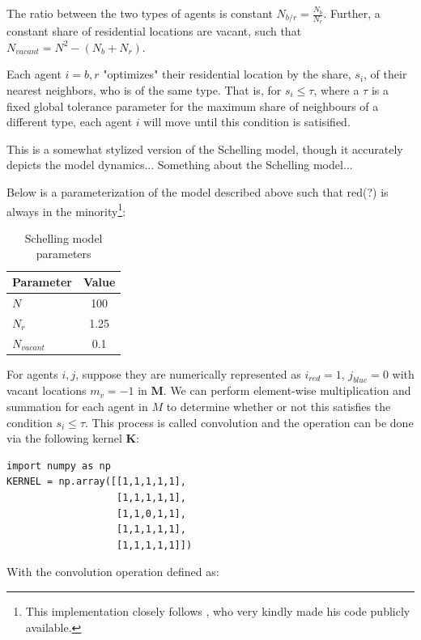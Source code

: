\documentclass[../main.tex]{subfiles}
\begin{document}
The ratio between the two types of agents is constant $N_{b/r} = \frac{N_b}{N_r}$. Further, a constant share of residential locations are vacant, such that $N_{vacant} = N^2 - (N_b + N_r)$. 

Each agent $i = b, r$ "optimizes" their residential location by the share, $s_i$, of their nearest neighbors, who is of the same type. That is, for $s_i \leq \tau$, where a $\tau$ is a fixed global tolerance parameter for the maximum share of neighbours of a different type, each agent $i$ will move until this condition is satisified. 

This is a somewhat stylized version of the Schelling model, though it accurately depicts the model dynamics... Something about the Schelling model... 

Below is a parameterization of the model described above such that red(?) is always in the minority\footnote{This implementation closely follows \textcite{luca_mingarelli}, who very kindly made his code publicly available.}:

\begin{table}[H]
    \centering
    \caption{Schelling model parameters}
    \begin{tabular}{lc}
    \toprule
      Parameter & Value \\
    \midrule
      $N$         & 100 \\
      $N_r$       & 1.25 \\
      $N_{vacant}$ & 0.1 \\
    \bottomrule
    \end{tabular}
\end{table}

For agents $i, j$, suppose they are numerically represented as $i_{red}=1$, $j_{blue} = 0$ with vacant locations $m_v=-1$ in $\textbf{M}$. We can perform element-wise multiplication and summation for each agent in $M$ to determine whether or not this satisfies the condition $s_i \leq \tau$. This process is called convolution and the operation can be done via the following kernel $\mathbf{K}$:

\newpage
\begin{lstlisting}[style=pythonstyle]
import numpy as np
KERNEL = np.array([[1,1,1,1,1],
                   [1,1,1,1,1],
                   [1,1,0,1,1],
                   [1,1,1,1,1],
                   [1,1,1,1,1]])

\end{lstlisting}

With the convolution operation defined as:
\end{document}
